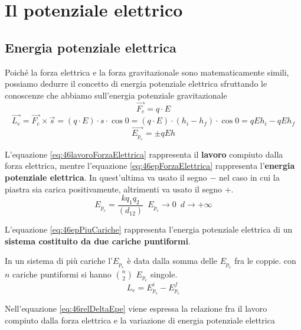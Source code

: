 \section{Il potenziale elettrico}
\subsection{Energia potenziale elettrica}
    \par Poiché la forza elettrica e la forza gravitazionale sono matematicamente simili, possiamo dedurre il concetto di energia potenziale elettrica sfruttando le conoscenze che abbiamo sull'energia potenziale gravitazionale
    \begin{equation*}
        \vec{F_e}=q\cdot E
    \end{equation*}
    \begin{equation}\label{eq:46lavoroForzaElettrica}
        \vec{L_e}=\vec{F_e}\times \vec{s}=(q\cdot E)\cdot s \cdot \cos 0=(q\cdot E)\cdot (h_i-h_f) \cdot \cos 0=qEh_i-qEh_f
    \end{equation}
    \begin{equation}\label{eq:46epForzaElettrica}
        \vec{E_{p_e}}=\pm qEh
    \end{equation}
    \par L'equazione \ref{eq:46lavoroForzaElettrica} rappresenta il \textbf{lavoro} compiuto dalla forza elettrica, mentre l'equazione \ref{eq:46epForzaElettrica} rappresenta l'\textbf{energia potenziale elettrica}. In quest'ultima va usato il segno $-$ nel caso in cui la piastra sia carica positivamente, altrimenti va usato il segno $+$.
    \begin{equation} \label{eq:46epPiuCariche}
        E_{p_e}=\frac{kq_{1}q_2}{(d_{12})} \enspace E_{p_e}\rightarrow 0 \enspace d \rightarrow +\infty
    \end{equation}
    \par L'equazione \ref{eq:46epPiuCariche} rappresenta l'energia potenziale elettrica di un \textbf{sistema costituito da due cariche puntiformi}.
    \par In un sistema di più cariche l'$E_{p_e}$ è data dalla somma delle $E_{p_e}$ fra le coppie. con $n$ cariche puntiformi si hanno $n\choose2$ $E_{p_e}$ singole.
    \begin{equation}\label{eq:46relDeltaEpe}
        L_e=E_{p_e}^i-E_{p_e}^f
    \end{equation}
    \par Nell'equazione \ref{eq:46relDeltaEpe} viene espressa la relazione fra il lavoro compiuto dalla forza elettrica e la variazione di energia potenziale elettrica

